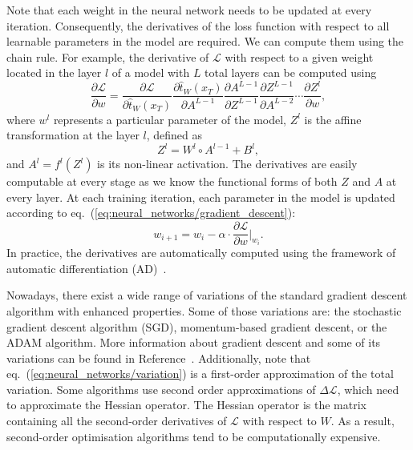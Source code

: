 Note that each weight in the neural network needs to be updated at every iteration. Consequently,
the derivatives of the loss function with respect to all learnable parameters in the model are
required. We can compute them using the chain rule. For example, the derivative of $\mathcal{L}$
with respect to a given weight located in the layer $l$ of a model with $L$ total layers can be
computed using
\begin{equation} 
    \frac{\partial \mathcal{L}}{\partial w} = 
        \frac{\partial \mathcal{L}}{\partial \hat{t}_W(x_T)} 
        \frac{\partial \hat{t}_W(x_T)}{\partial A^{L-1}} 
        \frac{\partial A^{L-1}}{\partial Z^{L-1}} 
        \frac{\partial Z^{L-1}}{\partial A^{L-2}} 
        \cdots 
        \frac{\partial Z^{l}}{\partial w}, 
\end{equation} 
where $w^l$ represents a particular parameter of the model, $Z^l$ is the affine transformation at
the layer $l$, defined as
\begin{equation}
    Z^l = W^l \circ A^{l-1} + B^l,
\end{equation}
and $A^l = f^l(Z^l)$ is its non-linear activation. The derivatives are easily computable at every
stage as we know the functional forms of both $Z$ and $A$ at every layer. At each training
iteration, each parameter in the model is updated according to
eq.~(\ref{eq:neural_networks/gradient_descent}):
\begin{equation} 
    w_{i + 1} = w_{i} - \alpha \cdot \frac{\partial \mathcal{L}}{\partial w}\bigg|_{w_i}. 
    \label{eq:neural_networks/weight_update}
\end{equation}
In practice, the derivatives are automatically computed using the framework of automatic
differentiation (AD)~\cite{paszke2017automatic, baydin2018automatic}.

Nowadays, there exist a wide range of variations of the standard gradient descent algorithm with
enhanced properties. Some of those variations are: the stochastic gradient descent algorithm (SGD),
momentum-based gradient descent, or the ADAM algorithm. More information about gradient descent and
some of its variations can be found in Reference~\cite{ruder2016overview}. Additionally, note that
eq.~(\ref{eq:neural_networks/variation}) is a first-order approximation of the total variation. Some
algorithms use second order approximations of $\Delta \mathcal{L}$, which need to approximate the
Hessian operator. The Hessian operator is the matrix containing all the second-order derivatives of
$\mathcal{L}$ with respect to $W$. As a result, second-order optimisation algorithms tend to be
computationally expensive.

